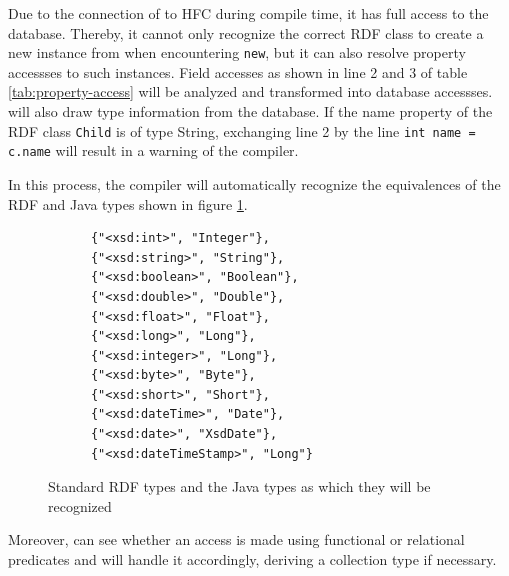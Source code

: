 %
Due to the connection of \vonda to HFC during compile time, it has full access
to the database. Thereby, it cannot only recognize the correct RDF class to
create a new instance from when encountering \texttt{new}, but it can also
resolve property accessses to such instances. Field accesses as shown in line 2
and 3 of table \ref{tab:property-access} will be analyzed and transformed into
database accessses. \vonda will also draw type information from the
database. If the name property of the RDF class \texttt{Child} is of type
String, exchanging line 2 by the line \texttt{int name = c.name} will result in
a warning of the compiler.

In this process, the compiler will automatically recognize the equivalences of the RDF and Java types shown in figure \ref{fig:RdfToJava}.

\begin{figure}[h] \label{fig:RdfToJava}
\small
\begin{lstlisting}
      {"<xsd:int>", "Integer"},
      {"<xsd:string>", "String"},
      {"<xsd:boolean>", "Boolean"},
      {"<xsd:double>", "Double"},
      {"<xsd:float>", "Float"},
      {"<xsd:long>", "Long"},
      {"<xsd:integer>", "Long"},
      {"<xsd:byte>", "Byte"},
      {"<xsd:short>", "Short"},
      {"<xsd:dateTime>", "Date"},
      {"<xsd:date>", "XsdDate"},
      {"<xsd:dateTimeStamp>", "Long"}
\end{lstlisting}
\caption{Standard RDF types and the Java types as which they will be recognized}
\end{figure}

%
Moreover, \vonda can see whether an access is made using functional or relational
predicates and will handle it accordingly, deriving a collection type if
necessary.

